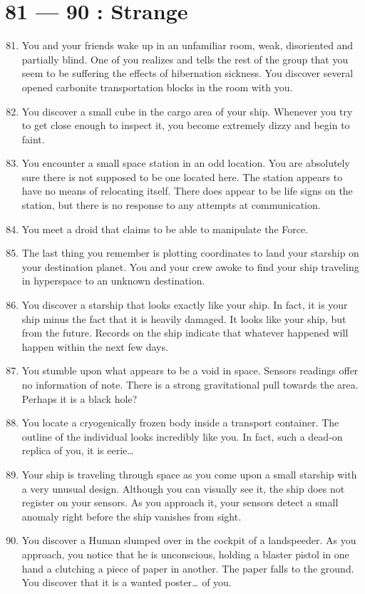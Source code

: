 \documentclass{article}
\begin{document}
\section*{81 --- 90 : Strange}
\begin{enumerate}
	\setcounter{enumi}{80}
	\item You and your friends wake up in an unfamiliar room, weak, disoriented and partially blind. One of you realizes and tells the rest of the group that you seem to be suffering the effects of hibernation sickness. You discover several opened carbonite transportation blocks in the room with you.
	\item You discover a small cube in the cargo area of your ship. Whenever you try to get close enough to inspect it, you become extremely dizzy and begin to faint.
	\item You encounter a small space station in an odd location. You are absolutely sure there is not supposed to be one located here. The station appears to have no means of relocating itself. There does appear to be life signs on the station, but there is no response to any attempts at communication.
	\item You meet a droid that claims to be able to manipulate the Force.
	\item The last thing you remember is plotting coordinates to land your starship on your destination planet. You and your crew awoke to find your ship traveling in hyperspace to an unknown destination.
	\item You discover a starship that looks exactly like your ship. In fact, it is your ship minus the fact that it is heavily damaged. It looks like your ship, but from the future. Records on the ship indicate that whatever happened will happen within the next few days.
	\item You stumble upon what appears to be a void in space. Sensors readings offer no information of note. There is a strong gravitational pull towards the area. Perhaps it is a black hole?
	\item You locate a cryogenically frozen body inside a transport container. The outline of the individual looks incredibly like you. In fact, such a dead-on replica of you, it is eerie…
	\item Your ship is traveling through space as you come upon a small starship with a very unusual design. Although you can visually see it, the ship does not register on your sensors. As you approach it, your sensors detect a small anomaly right before the ship vanishes from sight.
	\item You discover a Human slumped over in the cockpit of a landspeeder. As you approach, you notice that he is unconscious, holding a blaster pistol in one hand a clutching a piece of paper in another. The paper falls to the ground. You discover that it is a wanted poster… of you.
\end{enumerate}
\end{document}
